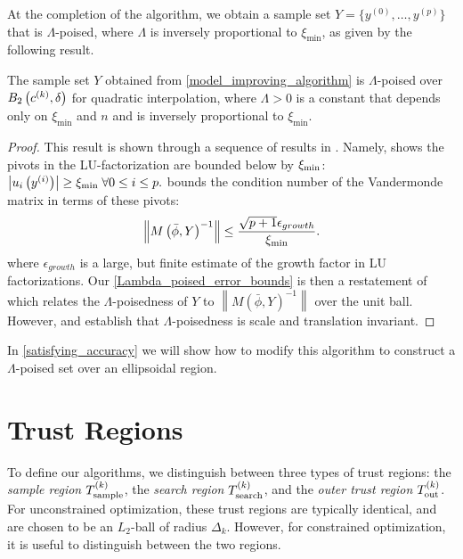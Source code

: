 At the completion of the algorithm, we obtain a  sample set $Y=\{y^{(0)}, \ldots, y^{(p)}\}$ that is $\Lambda$-poised, 
where $\Lambda$ is inversely proportional to $\xi_{\min}$, as given by the following result.
\begin{theorem}
\label{set_is_poised}
The sample set $Y$ obtained from \cref{model_improving_algorithm} is $\Lambda$-poised over $B_2\left(c^{(k)}, \delta\right)$ for quadratic interpolation, 
where $\Lambda > 0$ is a constant that depends only on $\xi_{\text{min}}$ and $n$ and is inversely proportional to $\xi_{\text{min}}$.
\end{theorem}

\begin{proof}
This result is shown through a sequence of results in \cite{introduction_book}.
Namely,  \cite[Theorem 6.5]{introduction_book} shows the pivots in the LU-factorization are bounded below by $\xi_{\text{min}}$:
$
\left|u_i\left(y^{(i)}\right)\right| \ge \xi_{\text{min}} \; \forall 0 \le i \le p.
$
\cite[Section 6.7, Exercise 3]{introduction_book}
 bounds the condition number of the Vandermonde matrix in terms of these pivots:
\begin{align*}
\left\|M\left(\bar \phi, Y\right)^{-1}\right\| \le \frac{\sqrt{p+1}\epsilon_{growth}}{\xi_{\text{min}}}.
\end{align*}
where $\epsilon_{growth}$ is a large, but finite estimate of the growth factor in LU factorizations.
Our \cref{Lambda_poised_error_bounds} is then a restatement of \cite[Theorem 3.14]{introduction_book} which 
relates the $\Lambda$-poisedness of $Y$ to $\left\|M\left(\bar \phi, Y\right)^{-1}\right\|$ over the unit ball.
However, \cite[Lemma 3.8]{introduction_book} and \cite[Lemma 3.9]{introduction_book} establish that $\Lambda$-poisedness is scale and translation invariant.
\end{proof}

In \cref{satisfying_accuracy} we will show how to modify this algorithm to construct a $\Lambda$-poised set over an ellipsoidal region.


\section{Trust Regions}

To define our algorithms, we distinguish between three types of trust regions: 
the {\em sample region} ${T_{\text{sample}}^{(k)}}$,
the {\em search region} ${T_{\text{search}}^{(k)}}$,
and the {\em outer trust region} ${T_{\text{out}}^{(k)}}$.
For unconstrained optimization,  these trust regions are typically identical,  and are chosen to be an $L_2$-ball of radius $\Delta_k$.
However, for constrained optimization, it is useful to distinguish between the two regions.



